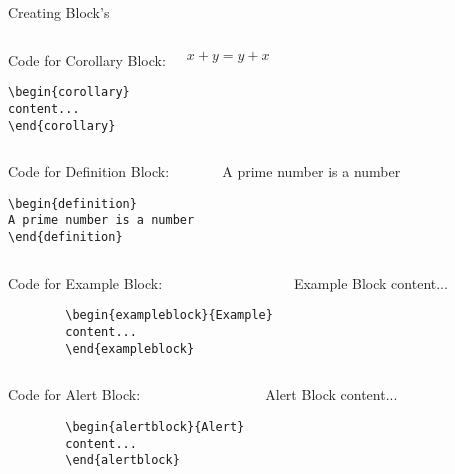 \documentclass[10pt,xcolor=x11names]{beamer}
\begin{document}
\begin{frame}{Creating Block's}
{\begin{columns}[t]
	\begin{block}{Code for Corollary Block:}
		\begin{verbatim}
\begin{corollary}
content...
\end{corollary}
		\end{verbatim}	
	\end{block}
     \begin{corollary}
	$ x + y = y + x  $
    \end{corollary}
\end{columns}

\begin{columns}[t]
	\begin{block}{Code for Definition Block:}
		\begin{verbatim}
\begin{definition}
A prime number is a number 
\end{definition}
		\end{verbatim}	
	\end{block}
        \begin{definition}
	    A prime number is a number 
       \end{definition}
\end{columns}}
\vspace{14pt}

\begin{columns}[t]
	\begin{block}{Code for Example Block:}
		\begin{verbatim}
		\begin{exampleblock}{Example}
		content...
		\end{exampleblock}
		\end{verbatim}
	\end{block}
	\begin{exampleblock}{Example Block}
		content...
	\end{exampleblock}
\end{columns}

\begin{columns}[t]
	\begin{block}{Code for Alert Block:}
		\begin{verbatim}
		\begin{alertblock}{Alert}
		content...
		\end{alertblock}
		\end{verbatim}
	\end{block}
	\begin{alertblock}{Alert Block}
		content...
	\end{alertblock}
\end{columns}

\end{frame}
\end{document}
